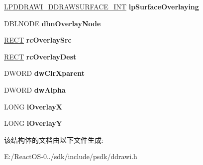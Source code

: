 \begin{DoxyCompactItemize}
\item 
\mbox{\label{struct___d_d_r_a_w_i___d_d_r_a_w_s_u_r_f_a_c_e___l_c_l_a348c816a410e5c0c0fc79214998c56bc}} 
\hyperlink{struct___d_d_r_a_w_i___d_d_r_a_w_s_u_r_f_a_c_e___i_n_t}{L\+P\+D\+D\+R\+A\+W\+I\+\_\+\+D\+D\+R\+A\+W\+S\+U\+R\+F\+A\+C\+E\+\_\+\+I\+NT} {\bfseries lp\+Surface\+Overlaying}
\item 
\mbox{\label{struct___d_d_r_a_w_i___d_d_r_a_w_s_u_r_f_a_c_e___l_c_l_ad1c5ca6435166c6463632bfa5394c325}} 
\hyperlink{struct___d_b_l_n_o_d_e}{D\+B\+L\+N\+O\+DE} {\bfseries dbn\+Overlay\+Node}
\item 
\mbox{\label{struct___d_d_r_a_w_i___d_d_r_a_w_s_u_r_f_a_c_e___l_c_l_a14deeeb0c2a9dc53e1117ebe4d850637}} 
\hyperlink{structtag_r_e_c_t}{R\+E\+CT} {\bfseries rc\+Overlay\+Src}
\item 
\mbox{\label{struct___d_d_r_a_w_i___d_d_r_a_w_s_u_r_f_a_c_e___l_c_l_a26b89ad7c3674daca3b92cffff7ceb0d}} 
\hyperlink{structtag_r_e_c_t}{R\+E\+CT} {\bfseries rc\+Overlay\+Dest}
\item 
\mbox{\label{struct___d_d_r_a_w_i___d_d_r_a_w_s_u_r_f_a_c_e___l_c_l_abb6fa23b4c700107c0463013ceb98ceb}} 
D\+W\+O\+RD {\bfseries dw\+Clr\+Xparent}
\item 
\mbox{\label{struct___d_d_r_a_w_i___d_d_r_a_w_s_u_r_f_a_c_e___l_c_l_a5ae86595e34306096cc243a40b9573e3}} 
D\+W\+O\+RD {\bfseries dw\+Alpha}
\item 
\mbox{\label{struct___d_d_r_a_w_i___d_d_r_a_w_s_u_r_f_a_c_e___l_c_l_a18f4a46c9c14f17216e7ab36277c98f3}} 
L\+O\+NG {\bfseries l\+OverlayX}
\item 
\mbox{\label{struct___d_d_r_a_w_i___d_d_r_a_w_s_u_r_f_a_c_e___l_c_l_aaa0316599219b8652bd59ff8316245b8}} 
L\+O\+NG {\bfseries l\+OverlayY}
\end{DoxyCompactItemize}


该结构体的文档由以下文件生成\+:\begin{DoxyCompactItemize}
\item 
E\+:/\+React\+O\+S-\/0../sdk/include/psdk/ddrawi.\+h\end{DoxyCompactItemize}
